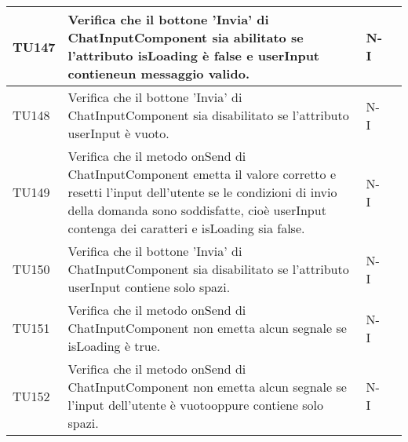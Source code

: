 \begin{table}[h!]
\begin{tabularx}{\textwidth}{|p{}|X|p{}|p{}|}
    TU147 & Verifica che il bottone 'Invia' di ChatInputComponent sia abilitato se l'attributo isLoading è false e userInput contieneun messaggio valido. &  N-I \\ \hline
    TU148 & Verifica che il bottone 'Invia' di ChatInputComponent sia disabilitato se l'attributo userInput è vuoto. &  N-I \\ \hline
    TU149 & Verifica che il metodo onSend di ChatInputComponent emetta il valore corretto e resetti l'input dell'utente se le condizioni di invio della domanda sono soddisfatte, cioè userInput contenga dei caratteri e isLoading sia false. &  N-I \\ \hline
    TU150 & Verifica che il bottone 'Invia' di ChatInputComponent sia disabilitato se l'attributo userInput contiene solo spazi. &  N-I \\ \hline
    TU151 & Verifica che il metodo onSend di ChatInputComponent non emetta alcun segnale se isLoading è true. &  N-I \\ \hline
    TU152 & Verifica che il metodo onSend di ChatInputComponent non emetta alcun segnale se l'input dell'utente è vuotooppure contiene solo spazi. &  N-I \\ \hline

    \end{tabularx}
\end{table}

\newpage


